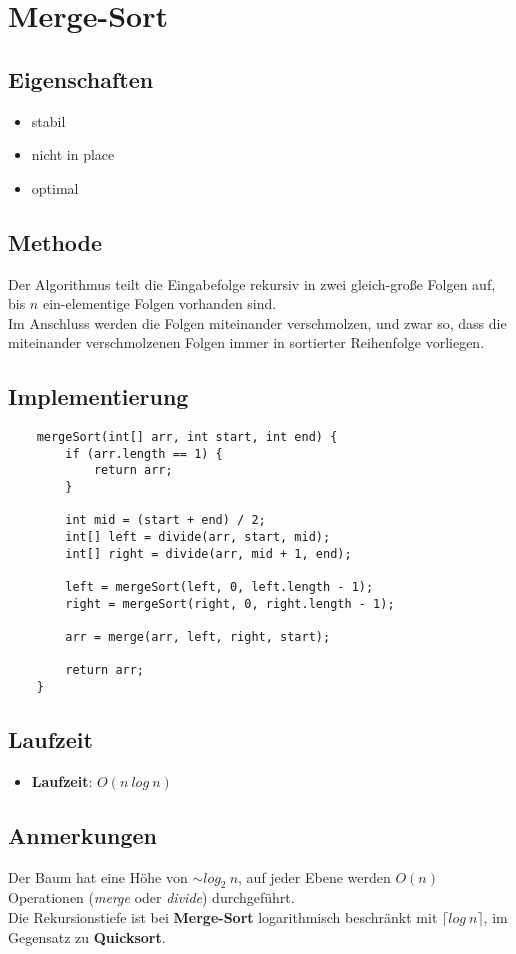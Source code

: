 \section{Merge-Sort}


\subsection{Eigenschaften}
\begin{itemize}
    \item stabil
    \item nicht in place
    \item optimal
\end{itemize}

\subsection{Methode}
Der Algorithmus teilt die Eingabefolge rekursiv in zwei gleich-große Folgen auf, bis $n$ ein-elementige Folgen vorhanden sind.\\
Im Anschluss werden die Folgen miteinander verschmolzen, und zwar so, dass die miteinander verschmolzenen Folgen immer in sortierter Reihenfolge vorliegen.\\


\subsection{Implementierung}
\begin{verbatim}
    mergeSort(int[] arr, int start, int end) {
        if (arr.length == 1) {
            return arr;
        }

        int mid = (start + end) / 2;
        int[] left = divide(arr, start, mid);
        int[] right = divide(arr, mid + 1, end);

        left = mergeSort(left, 0, left.length - 1);
        right = mergeSort(right, 0, right.length - 1);

        arr = merge(arr, left, right, start);

        return arr;
    }
\end{verbatim}


\subsection{Laufzeit}
\begin{itemize}
    \item \textbf{Laufzeit}: $O(n\ log\ n)$
\end{itemize}

\subsection{Anmerkungen}
Der Baum hat eine Höhe von $\sim log_2\ n$, auf jeder Ebene werden $O(n)$ Operationen (\textit{merge} oder \textit{divide}) durchgeführt.\\
Die Rekursionstiefe ist bei \textbf{Merge-Sort} logarithmisch beschränkt mit $\lceil log\ n \rceil$, im Gegensatz zu \textbf{Quicksort}.